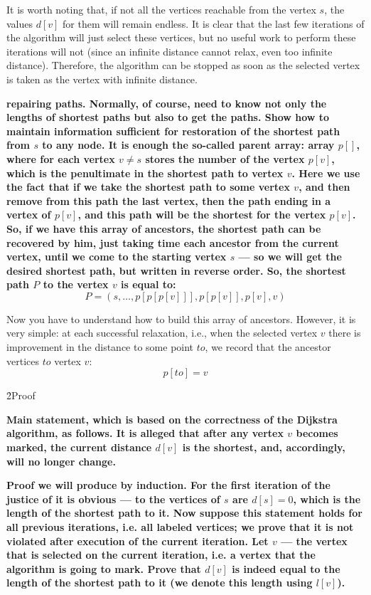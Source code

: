 It is worth noting that, if not all the vertices reachable from the vertex $s$, the values $d[v]$ for them will remain endless. It is clear that the last few iterations of the algorithm will just select these vertices, but no useful work to perform these iterations will not (since an infinite distance cannot relax, even too infinite distance). Therefore, the algorithm can be stopped as soon as the selected vertex is taken as the vertex with infinite distance.

\bf{repairing paths}. Normally, of course, need to know not only the lengths of shortest paths but also to get the paths. Show how to maintain information sufficient for restoration of the shortest path from $s$ to any node. It is enough the so-called \bf{parent array}: array $p[]$, where for each vertex $v \ne s$ stores the number of the vertex $p[v]$, which is the penultimate in the shortest path to vertex $v$. Here we use the fact that if we take the shortest path to some vertex $v$, and then remove from this path the last vertex, then the path ending in a vertex of $p[v]$, and this path will be the shortest for the vertex $p[v]$. So, if we have this array of ancestors, the shortest path can be recovered by him, just taking time each ancestor from the current vertex, until we come to the starting vertex $s$ --- so we will get the desired shortest path, but written in reverse order. So, the shortest path $P$ to the vertex $v$ is equal to:
$$ P = (s, \ldots, p[p[p[v]]], p[p[v]], p[v], v) $$

Now you have to understand how to build this array of ancestors. However, it is very simple: at each successful relaxation, i.e., when the selected vertex $v$ there is improvement in the distance to some point $to$, we record that the ancestor vertices $to$ vertex $v$:
$$ p[to] = v $$

\h2{Proof}

\bf{Main statement}, which is based on the correctness of the Dijkstra algorithm, as follows. It is alleged that after any vertex $v$ becomes marked, the current distance $d[v]$ is the shortest, and, accordingly, will no longer change.

\bf{Proof} we will produce by induction. For the first iteration of the justice of it is obvious --- to the vertices of $s$ are $d[s]=0$, which is the length of the shortest path to it. Now suppose this statement holds for all previous iterations, i.e. all labeled vertices; we prove that it is not violated after execution of the current iteration. Let $v$ --- the vertex that is selected on the current iteration, i.e. a vertex that the algorithm is going to mark. Prove that $d[v]$ is indeed equal to the length of the shortest path to it (we denote this length using $l[v]$).

